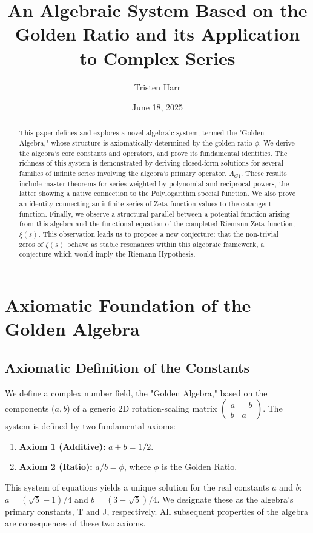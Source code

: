 \documentclass[12pt, letterpaper]{article}
\title{\textbf{An Algebraic System Based on the Golden Ratio and its Application to Complex Series}}
\author{Tristen Harr}
\affil{\textit{Saint Charles, Missouri}}
\date{June 18, 2025}
\begin{document}
\maketitle

\begin{abstract}
This paper defines and explores a novel algebraic system, termed the "Golden Algebra," whose structure is axiomatically determined by the golden ratio $\phi$. We derive the algebra's core constants and operators, and prove its fundamental identities. The richness of this system is demonstrated by deriving closed-form solutions for several families of infinite series involving the algebra's primary operator, $\Lambda_{G1}$. These results include master theorems for series weighted by polynomial and reciprocal powers, the latter showing a native connection to the Polylogarithm special function. We also prove an identity connecting an infinite series of Zeta function values to the cotangent function. Finally, we observe a structural parallel between a potential function arising from this algebra and the functional equation of the completed Riemann Zeta function, $\xi(s)$. This observation leads us to propose a new conjecture: that the non-trivial zeros of $\zeta(s)$ behave as stable resonances within this algebraic framework, a conjecture which would imply the Riemann Hypothesis.
\end{abstract}

\section{Axiomatic Foundation of the Golden Algebra}
\subsection{Axiomatic Definition of the Constants}
We define a complex number field, the "Golden Algebra," based on the components ($a, b$) of a generic 2D rotation-scaling matrix $\begin{pmatrix} a & -b \\ b & a \end{pmatrix}$. The system is defined by two fundamental axioms:
\begin{enumerate}
    \item \textbf{Axiom 1 (Additive):} $a+b=1/2$.
    \item \textbf{Axiom 2 (Ratio):} $a/b=\phi$, where $\phi$ is the Golden Ratio.
\end{enumerate}
This system of equations yields a unique solution for the real constants $a$ and $b$: $a=(\sqrt{5}-1)/4$ and $b=(3-\sqrt{5})/4$. We designate these as the algebra's primary constants, T and J, respectively. All subsequent properties of the algebra are consequences of these two axioms.
\end{document}

